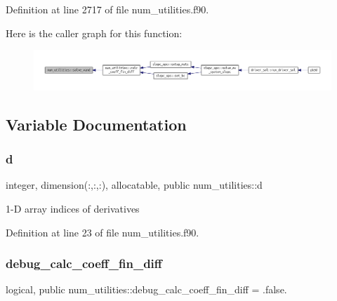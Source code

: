 Definition at line 2717 of file num\+\_\+utilities.\+f90.

Here is the caller graph for this function\+:\nopagebreak
\begin{figure}[H]
\begin{center}
\leavevmode
\includegraphics[width=350pt]{namespacenum__utilities_a54c65e345182e2e7e13ac14a0ba3647a_icgraph}
\end{center}
\end{figure}


\subsection{Variable Documentation}
\mbox{\label{namespacenum__utilities_a763215553acfcc054b1ec1bc207a1793}} 
\subsubsection{\texorpdfstring{d}{d}}
{\footnotesize\ttfamily integer, dimension(\+:,\+:,\+:), allocatable, public num\+\_\+utilities\+::d}



1-\/D array indices of derivatives 



Definition at line 23 of file num\+\_\+utilities.\+f90.

\mbox{\label{namespacenum__utilities_ae20985c8049d39f987fa23d728688cbc}} 
\subsubsection{\texorpdfstring{debug\+\_\+calc\+\_\+coeff\+\_\+fin\+\_\+diff}{debug\_calc\_coeff\_fin\_diff}}
{\footnotesize\ttfamily logical, public num\+\_\+utilities\+::debug\+\_\+calc\+\_\+coeff\+\_\+fin\+\_\+diff = .false.}



